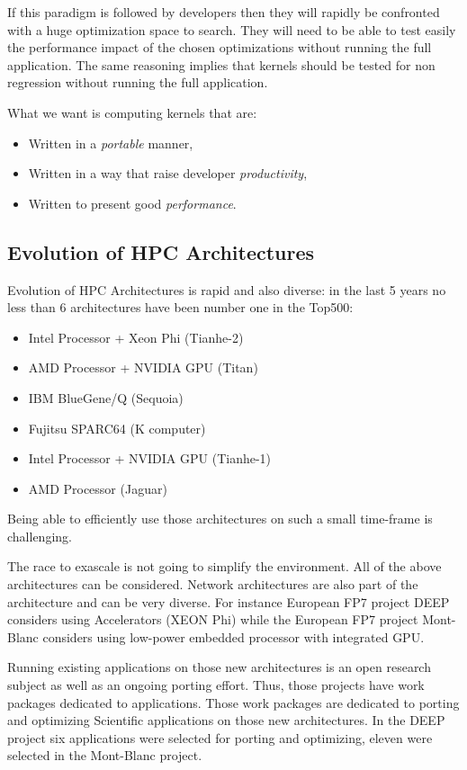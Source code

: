 \documentclass[11pt, a4paper, twoside]{montblanc}
\begin{document}
If this paradigm is followed by developers then they will rapidly be confronted
with a huge optimization space to search. They will need to be able to test
easily the performance impact of the chosen optimizations without running the
full application. The same reasoning implies that kernels should be tested for
non regression without running the full application.

What we want is computing kernels that are:
\begin{itemize}
\item Written in a \emph{portable} manner,
\item Written in a way that raise developer \emph{productivity},
\item Written to present good \emph{performance}.
\end{itemize}



  \subsection{Evolution of HPC Architectures}

Evolution of HPC Architectures is rapid and also diverse: in the last 5
years no less than 6 architectures have been number one in the Top500:
\begin{itemize}
\item Intel Processor + Xeon Phi (Tianhe-2)
\item AMD Processor + NVIDIA GPU (Titan)
\item IBM BlueGene/Q (Sequoia)
\item Fujitsu SPARC64 (K computer)
\item Intel Processor + NVIDIA GPU (Tianhe-1)
\item AMD Processor (Jaguar)
\end{itemize}
Being able to efficiently use those architectures on such a small
time-frame is challenging.

The race to exascale is not going to simplify the environment. All of the above
architectures can be considered. Network architectures are also part of the
architecture and can be very diverse.  For instance European FP7 project DEEP
considers using Accelerators (XEON Phi) while the European FP7 project
Mont-Blanc considers using low-power embedded processor with integrated GPU.

Running existing applications on those new architectures is an open research
subject as well as an ongoing porting effort.  Thus, those projects have work
packages dedicated to applications. Those work packages are dedicated to porting
and optimizing Scientific applications on those new architectures. In the DEEP
project six applications were selected for porting and optimizing, eleven were
selected in the Mont-Blanc project.
\end{document}
